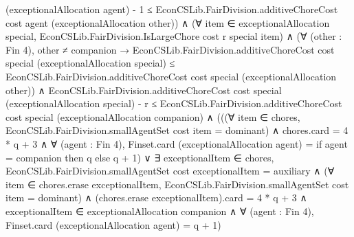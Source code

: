 \documentclass[10pt]{article}
\begin{document}
\begin{ReviewVerbatim}
                                                      (exceptionalAllocation agent) -
                                                    1 ≤
                                                  EconCSLib.FairDivision.additiveChoreCost cost agent
                                                    (exceptionalAllocation other)) ∧
                                          (∀ item ∈ exceptionalAllocation special,
                                              EconCSLib.FairDivision.IsLargeChore cost r special item) ∧
                                            (∀ (other : Fin 4),
                                                other ≠ companion →
                                                  EconCSLib.FairDivision.additiveChoreCost cost special
                                                      (exceptionalAllocation special) ≤
                                                    EconCSLib.FairDivision.additiveChoreCost cost special
                                                      (exceptionalAllocation other)) ∧
                                              EconCSLib.FairDivision.additiveChoreCost cost special
                                                      (exceptionalAllocation special) -
                                                    r ≤
                                                  EconCSLib.FairDivision.additiveChoreCost cost special
                                                    (exceptionalAllocation companion) ∧
                                                (((∀ item ∈ chores,
                                                      EconCSLib.FairDivision.smallAgentSet cost item = dominant) ∧
                                                    chores.card = 4 * q + 3 ∧
                                                      ∀ (agent : Fin 4),
                                                        Finset.card (exceptionalAllocation agent) =
                                                          if agent = companion then q else q + 1) ∨
                                                  ∃ exceptionalItem ∈ chores,
                                                    EconCSLib.FairDivision.smallAgentSet cost exceptionalItem =
                                                        auxiliary ∧
                                                      (∀ item ∈ chores.erase exceptionalItem,
                                                          EconCSLib.FairDivision.smallAgentSet cost item = dominant) ∧
                                                        (chores.erase exceptionalItem).card = 4 * q + 3 ∧
                                                          exceptionalItem ∈ exceptionalAllocation companion ∧
                                                            ∀ (agent : Fin 4),
                                                              Finset.card (exceptionalAllocation agent) = q + 1)
\end{ReviewVerbatim}
\end{document}
